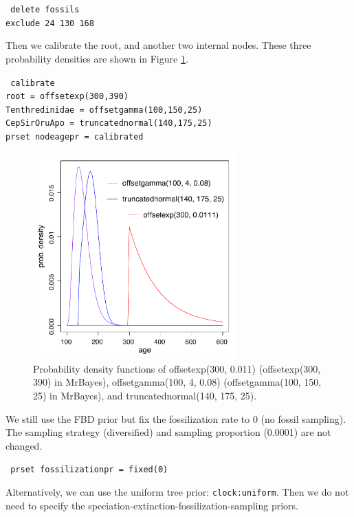 \documentclass[12pt]{article}
\begin{document}
\medskip
{\tt \color{red} \noindent
delete fossils \\
exclude 24 130 168
}
\medskip

Then we calibrate the root, and another two internal nodes.
These three probability densities are shown in Figure \ref{fig_nodecali}.

\medskip
{\tt \color{red} \noindent
calibrate  \\
\indent root = offsetexp(300,390) \\
\indent Tenthredinidae = offsetgamma(100,150,25)   \\
\indent CepSirOruApo = truncatednormal(140,175,25) \\
prset nodeagepr = calibrated
}
\medskip

\begin{figure}[h]
\includegraphics[width=0.7\textwidth]{figures/nodecali.pdf}
\caption{Probability density functions of offsetexp(300, 0.011) (offsetexp(300, 390) in MrBayes), offsetgamma(100, 4, 0.08) (offsetgamma(100, 150, 25) in MrBayes), and truncatednormal(140, 175, 25).
}
\label{fig_nodecali}
\end{figure}

We still use the FBD prior but fix the fossilization rate to 0 (no fossil sampling).
The sampling strategy (diversified) and sampling proportion (0.0001) are not changed.

\medskip
{\tt \color{red} \noindent
prset fossilizationpr = fixed(0)
}
\medskip

\noindent Alternatively, we can use the uniform tree prior: {\tt clock:uniform}.
Then we do not need to specify the speciation-extinction-fossilization-sampling priors.
\end{document}
